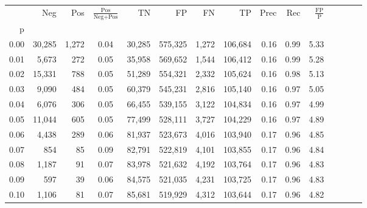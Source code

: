 \begin{tabular}{rrrcrrrrrrrrrrr}
\toprule
{} &     Neg &    Pos & $\frac{\text{Pos}}{\text{Neg}+\text{Pos}}$ &       TN &       FP &       FN &       TP &  Prec &   Rec & $\frac{\text{FP}}{\text{P}}$ \\
p    &         &        &                                            &          &          &          &          &       &       &                              \\
\midrule
0.00 &  30,285 &  1,272 &                                       0.04 &   30,285 &  575,325 &    1,272 &  106,684 &  0.16 &  0.99 &                         5.33 \\
0.01 &   5,673 &    272 &                                       0.05 &   35,958 &  569,652 &    1,544 &  106,412 &  0.16 &  0.99 &                         5.28 \\
0.02 &  15,331 &    788 &                                       0.05 &   51,289 &  554,321 &    2,332 &  105,624 &  0.16 &  0.98 &                         5.13 \\
0.03 &   9,090 &    484 &                                       0.05 &   60,379 &  545,231 &    2,816 &  105,140 &  0.16 &  0.97 &                         5.05 \\
0.04 &   6,076 &    306 &                                       0.05 &   66,455 &  539,155 &    3,122 &  104,834 &  0.16 &  0.97 &                         4.99 \\
0.05 &  11,044 &    605 &                                       0.05 &   77,499 &  528,111 &    3,727 &  104,229 &  0.16 &  0.97 &                         4.89 \\
0.06 &   4,438 &    289 &                                       0.06 &   81,937 &  523,673 &    4,016 &  103,940 &  0.17 &  0.96 &                         4.85 \\
0.07 &     854 &     85 &                                       0.09 &   82,791 &  522,819 &    4,101 &  103,855 &  0.17 &  0.96 &                         4.84 \\
0.08 &   1,187 &     91 &                                       0.07 &   83,978 &  521,632 &    4,192 &  103,764 &  0.17 &  0.96 &                         4.83 \\
0.09 &     597 &     39 &                                       0.06 &   84,575 &  521,035 &    4,231 &  103,725 &  0.17 &  0.96 &                         4.83 \\
0.10 &   1,106 &     81 &                                       0.07 &   85,681 &  519,929 &    4,312 &  103,644 &  0.17 &  0.96 &                         4.82 \\

\end{tabular}
